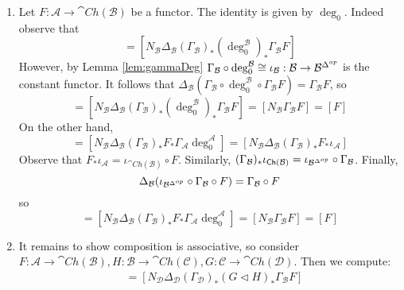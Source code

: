 \begin{enumerate}
    \item Let $F:\mathcal{A}\rightarrow \cat{Ch}(\mathcal{B})$ be a functor. The identity is given by $\deg_0$. Indeed observe that
    \begin{equation*}
        [\deg_0^\mathcal{B}\lhd F] = [N_\mathcal{B}\Delta_\mathcal{B}(\Gamma_\mathcal{B})_*(\deg_0^\mathcal{B})_*\Gamma_\mathcal{B} F]
    \end{equation*}
    However, by Lemma \ref{lem:gammaDeg} $\Gamma_\mathcal{B}\circ \deg_0^\mathcal{B} \cong \iota_\mathcal{B}:\mathcal{B}\rightarrow \mathcal{B}^{\Delta^{op}}$ is the constant functor. It follows that $\Delta_\mathcal{B}(\Gamma_{\mathcal{B}}\circ \deg_0^\mathcal{B}\circ \Gamma_\mathcal{B}F) = \Gamma_\mathcal{B}F$, so
    \begin{equation*}
        [\deg_0^\mathcal{B}\lhd F] = [N_\mathcal{B}\Delta_\mathcal{B}(\Gamma_\mathcal{B})_*(\deg_0^\mathcal{B})_*\Gamma_\mathcal{B} F] = [N_\mathcal{B}\Gamma_\mathcal{B}F] = [F]
    \end{equation*}
    On the other hand,
    \begin{equation*}
        [F\lhd \deg_0^\mathcal{A}] = [N_\mathcal{B}\Delta_\mathcal{B}(\Gamma_\mathcal{B})_*F_*\Gamma_\mathcal{A}\deg_0^\mathcal{A}] = [N_\mathcal{B}\Delta_\mathcal{B}(\Gamma_\mathcal{B})_*F_*\iota_\mathcal{A}]
    \end{equation*}
    Observe that $F_*\iota_\mathcal{A} = \iota_{\cat{Ch}(\mathcal{B})}\circ F$. Similarly, $(\Gamma_\mathcal{B})_*\iota_{\textup{\textsf{Ch}}(\mathcal{B})} = \iota_{\mathcal{B}^{\Delta^{op}}}\circ\Gamma_\mathcal{B}$. Finally,
    \begin{equation*}
        \Delta_\mathcal{B}(\iota_{\mathcal{B}^{\Delta^{op}}}\circ\Gamma_\mathcal{B}\circ F) = \Gamma_\mathcal{B}\circ F
    \end{equation*}
    so
    \begin{equation*}
        [F\lhd \deg_0^\mathcal{A}] = [N_\mathcal{B}\Delta_\mathcal{B}(\Gamma_\mathcal{B})_*F_*\Gamma_\mathcal{A}\deg_0^\mathcal{A}] = [N_\mathcal{B}\Gamma_\mathcal{B}F] = [F]
    \end{equation*}
    \item It remains to show composition is associative, so consider $F:\mathcal{A}\rightarrow \cat{Ch}(\mathcal{B}),H:\mathcal{B}\rightarrow \cat{Ch}(\mathcal{C}),G:\mathcal{C}\rightarrow \cat{Ch}(\mathcal{D})$. Then we compute:
    \begin{align*}
        [(G\lhd H)\lhd F] &= [N_\mathcal{D}\Delta_\mathcal{D}(\Gamma_\mathcal{D})_*(G\lhd H)_*\Gamma_\mathcal{B}F] \\

\end{align*}
\end{enumerate}
